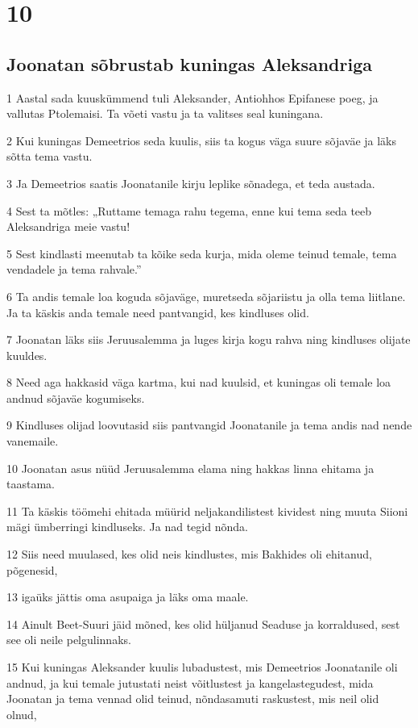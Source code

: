 \chapter{10}

\section*{Joonatan sõbrustab kuningas Aleksandriga}

\par 1 Aastal sada kuuskümmend tuli Aleksander, Antiohhos Epifanese poeg, ja vallutas Ptolemaisi. Ta võeti vastu ja ta valitses seal kuningana.
\par 2 Kui kuningas Demeetrios seda kuulis, siis ta kogus väga suure sõjaväe ja läks sõtta tema vastu.
\par 3 Ja Demeetrios saatis Joonatanile kirju leplike sõnadega, et teda austada.
\par 4 Sest ta mõtles: „Ruttame temaga rahu tegema, enne kui tema seda teeb Aleksandriga meie vastu!
\par 5 Sest kindlasti meenutab ta kõike seda kurja, mida oleme teinud temale, tema vendadele ja tema rahvale.”
\par 6 Ta andis temale loa koguda sõjaväge, muretseda sõjariistu ja olla tema liitlane. Ja ta käskis anda temale need pantvangid, kes kindluses olid.
\par 7 Joonatan läks siis Jeruusalemma ja luges kirja kogu rahva ning kindluses olijate kuuldes.
\par 8 Need aga hakkasid väga kartma, kui nad kuulsid, et kuningas oli temale loa andnud sõjaväe kogumiseks.
\par 9 Kindluses olijad loovutasid siis pantvangid Joonatanile ja tema andis nad nende vanemaile.
\par 10 Joonatan asus nüüd Jeruusalemma elama ning hakkas linna ehitama ja taastama.
\par 11 Ta käskis töömehi ehitada müürid neljakandilistest kividest ning muuta Siioni mägi ümberringi kindluseks. Ja nad tegid nõnda.
\par 12 Siis need muulased, kes olid neis kindlustes, mis Bakhides oli ehitanud, põgenesid,
\par 13 igaüks jättis oma asupaiga ja läks oma maale.
\par 14 Ainult Beet-Suuri jäid mõned, kes olid hüljanud Seaduse ja korraldused, sest see oli neile pelgulinnaks.
\par 15 Kui kuningas Aleksander kuulis lubadustest, mis Demeetrios Joonatanile oli andnud, ja kui temale jutustati neist võitlustest ja kangelastegudest, mida Joonatan ja tema vennad olid teinud, nõndasamuti raskustest, mis neil olid olnud,
